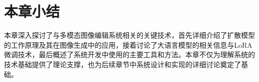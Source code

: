 \documentclass[a4paper,AutoFakeBold,oneside,12pt]{book}
\begin{document}
\section{本章小结}
本章深入探讨了与多模态图像编辑系统相关的关键技术，首先详细介绍了扩散模型的工作原理及其在图像生成中的应用，接着讨论了大语言模型的相关信息与LoRA微调技术，最后概述了系统开发中使用的主要工具和方法。本章不仅为理解系统的技术基础提供了理论支撑，也为后续章节中系统设计和实现的详细讨论奠定了基础。






\end{document}
